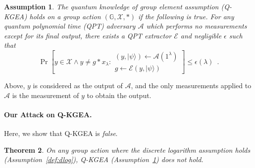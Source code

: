 \documentclass{article}\usepackage[a4paper,margin=20mm]{geometry}
\newtheorem{theorem}{Theorem}\newtheorem{lemma}[theorem]{Lemma}\newtheorem{proposition}[theorem]{Proposition}\newtheorem{corollary}[theorem]{Corollary}\newtheorem{definition}[theorem]{Definition}\newtheorem{claim}[theorem]{Claim}\newtheorem{remark}[theorem]{Remark}\newtheorem{observation}[theorem]{Observation}\newtheorem{conjecture}[theorem]{Conjecture}\newtheorem{example}[theorem]{Example}
\newtheorem{assumption}[theorem]{Assumption}
\numberwithin{theorem}{section}
\numberwithin{equation}{section}
\newcommand{\G}{\mathbb{G}}
\newcommand{\As}{{\mathcal{A}}}
\newcommand{\Es}{{\mathcal{E}}}
\newcommand{\Xs}{{\mathcal{X}}}
\begin{document}
\begin{assumption}\label{def:qkgea} The \emph{quantum knowledge of group element assumption} (Q-KGEA) holds on a group action $(\G,\Xs,*)$ if the following is true. For any quantum polynomial time (QPT) adversary $\As$ which performs no measurements except for its final output, there exists a QPT extractor $\Es$ and negligible $\epsilon$ such that 
	\[\Pr\left[y\in\Xs\wedge y\neq g*x_\lambda:\substack{(y,|\psi\rangle)\gets\As(1^\lambda)\\g\gets\Es(y,|\psi\rangle)}\right]\leq\epsilon(\lambda)\enspace .\]
\end{assumption}
Above, $y$ is considered as the output of $\As$, and the only measurements applied to $\As$ is the measurement of $y$ to obtain the output.

\paragraph{Our Attack on Q-KGEA.}\label{sec:KGEAattack} Here, we show that Q-KGEA is \emph{false}. 


\begin{theorem}\label{thm:kgeaattack} On any group action where the discrete logarithm assumption holds (Assumption~\ref{def:dlog}), Q-KGEA (Assumption~\ref{def:qkgea}) does not hold.
\end{theorem}
\end{document}
